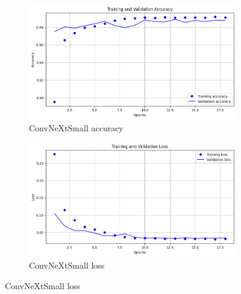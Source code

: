 \documentclass[runningheads]{llncs}
\begin{document}
\begin{figure}[htbp]
    \begin{subfigure}[b]{0.45\textwidth}
        \includegraphics[width=\textwidth]{graphics/accuracy_convnext.png}
        \caption{ConvNeXtSmall accuracy}
        \label{fig:graph3}
    \end{subfigure}
    \hfill
    \begin{subfigure}[b]{0.45\textwidth}
        \includegraphics[width=\textwidth]{graphics/loss_convnext.png}
        \caption{ConvNeXtSmall loss}
        \label{fig:graph4}
    \end{subfigure}

    \vspace{0.5cm}


\end{figure}
\end{document}
